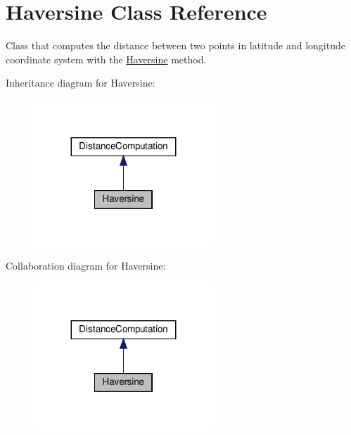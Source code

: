 \hypertarget{classHaversine}{}\section{Haversine Class Reference}
\label{classHaversine}


Class that computes the distance between two points in latitude and longitude coordinate system with the \hyperlink{classHaversine}{Haversine} method.  




Inheritance diagram for Haversine\+:\nopagebreak
\begin{figure}[H]
\begin{center}
\leavevmode
\includegraphics[width=191pt]{classHaversine__inherit__graph}
\end{center}
\end{figure}


Collaboration diagram for Haversine\+:\nopagebreak
\begin{figure}[H]
\begin{center}
\leavevmode
\includegraphics[width=191pt]{classHaversine__coll__graph}
\end{center}
\end{figure}
